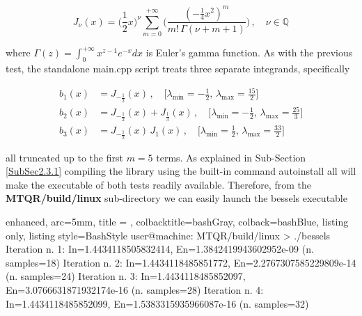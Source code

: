 \documentclass[a4paper, twosided]{book}
\begin{document}
\begin{equation*}
    J_{\nu}(x) = \bigg(\frac{1}{2}x\bigg)^{\nu}\sum_{m=0}^{+\infty}\bigg(\frac{(-\frac{1}{4}x^2)^{m}}{m!\,\Gamma(\nu+m+1)}\bigg)\,,\quad\nu\in\mathbb{Q}
\end{equation*}

\noindent
where $\Gamma(z)=\int_0^{+\infty}x^{z-1}e^{-x}dx$ is Euler's gamma function. As with the previous test, the standalone \colorbox{poliGrayBlue}{main.cpp} script treats three separate integrands, specifically

\begin{equation*}
    \begin{split}
        b_1(x) & = J_{-\frac{1}{2}}(x)\,,\quad\bigg[\lambda_{\text{min}}=-\frac{1}{2},\, \lambda_{\text{max}}=\frac{15}{2}\bigg] \\
        b_2(x) & = J_{-\frac{1}{2}}(x) + J_{\frac{1}{3}}(x)\,,\quad\bigg[\lambda_{\text{min}}=-\frac{1}{2},\, \lambda_{\text{max}}=\frac{25}{3}\bigg] \\
        b_3(x) & = J_{-\frac{1}{2}}(x)\,J_{1}(x)\,,\quad\bigg[\lambda_{\text{min}}=\frac{1}{2},\, \lambda_{\text{max}}=\frac{33}{2}\bigg] 
    \end{split}
\end{equation*}

\noindent
all truncated up to the first $m=5$ terms. As explained in Sub-Section \ref{SubSec2.3.1} compiling the library using the built-in command \colorbox{poliGrayBlue}{autoinstall all} will make the executable of both tests readily available. Therefore, from the \colorbox{poliGrayBlue}{\textbf{MTQR/build/linux}} sub-directory we can easily launch the \colorbox{poliGrayBlue}{bessels} executable

\vspace{0.2cm}
\begin{tcblisting}{enhanced,
                   arc=5mm,
                   title = \color{black}{\large \ttfamily Executing the bessels test case: b\_1(x)},
                   colbacktitle=bashGray,
                   colback=bashBlue,
                   listing only,
                   listing style=BashStyle}
user@machine: MTQR/build/linux > ./bessels 
Iteration n. 1:  In=1.4434118505832414, En=1.3842419943602952e-09   (n. samples=18)
Iteration n. 2:  In=1.4434118485851772, En=2.2767307585229809e-14   (n. samples=24)
Iteration n. 3:  In=1.4434118485852097, En=3.0766631871932174e-16   (n. samples=28)
Iteration n. 4:  In=1.4434118485852099, En=1.5383315935966087e-16   (n. samples=32)

\end{tcblisting}
\vspace{0.3cm}
\end{document}
